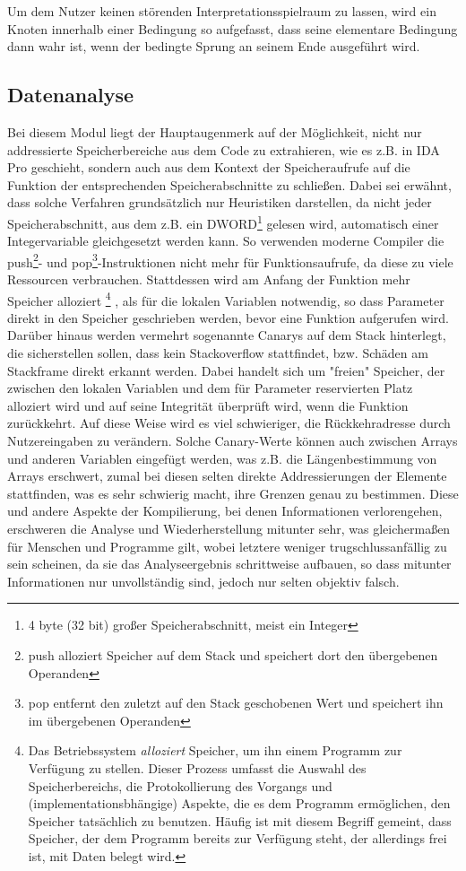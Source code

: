 \documentclass[11pt]{article}
\begin{document}
\begin{enumerate}
\begin{enumerate}
{				Um dem Nutzer keinen störenden Interpretationsspielraum zu
				lassen, wird ein Knoten innerhalb einer Bedingung so aufgefasst, dass seine
				elementare Bedingung dann wahr ist, wenn der bedingte Sprung an seinem Ende
				ausgeführt wird.}
		\end{enumerate}
\end{enumerate}

\subsection{Datenanalyse}
Bei diesem Modul liegt der Hauptaugenmerk auf der Möglichkeit, nicht nur
addressierte Speicherbereiche aus dem Code zu extrahieren, wie es z.B. in IDA Pro
geschieht, sondern auch aus dem Kontext der Speicheraufrufe auf die Funktion der entsprechenden
Speicherabschnitte zu schließen. Dabei sei erwähnt, dass solche Verfahren grundsätzlich nur
Heuristiken darstellen, da nicht jeder Speicherabschnitt, aus dem z.B. ein DWORD\footnote{4 byte (32
bit) großer Speicherabschnitt, meist ein Integer} gelesen wird, automatisch einer Integervariable
gleichgesetzt werden kann. So verwenden moderne Compiler die push\footnote{push alloziert Speicher
auf dem Stack und speichert dort den übergebenen Operanden}- und pop\footnote{pop entfernt den
zuletzt auf den Stack geschobenen Wert und speichert ihn im übergebenen Operanden}-Instruktionen
nicht mehr für Funktionsaufrufe, da diese zu viele Ressourcen verbrauchen. Stattdessen wird am
Anfang der Funktion mehr Speicher alloziert
\footnote{Das Betriebssystem \textit{alloziert} Speicher, um ihn einem Programm zur Verfügung zu
stellen. Dieser Prozess umfasst die Auswahl des Speicherbereichs, die Protokollierung des Vorgangs
und (implementationsbhängige) Aspekte, die es dem Programm ermöglichen, den Speicher tatsächlich
zu benutzen. Häufig ist mit diesem Begriff gemeint, dass Speicher, der dem Programm bereits zur Verfügung
steht, der allerdings frei ist, mit Daten belegt wird.}
, als für die lokalen Variablen notwendig, so dass
Parameter direkt in den Speicher geschrieben werden, bevor eine Funktion aufgerufen wird. Darüber
hinaus werden vermehrt sogenannte Canarys auf dem Stack hinterlegt, die sicherstellen sollen, dass
kein Stackoverflow stattfindet, bzw. Schäden am Stackframe direkt erkannt werden.
Dabei handelt sich um "freien" Speicher, der zwischen den lokalen
Variablen und dem für Parameter reservierten Platz alloziert wird und auf seine Integrität überprüft
wird, wenn die Funktion zurückkehrt. Auf diese Weise wird es viel schwieriger, die Rückkehradresse
durch Nutzereingaben zu verändern. Solche Canary-Werte können auch zwischen Arrays und anderen
Variablen eingefügt werden, was z.B. die Längenbestimmung von Arrays erschwert, zumal bei diesen
selten direkte Addressierungen der Elemente stattfinden, was es sehr schwierig macht, ihre Grenzen
genau zu bestimmen. Diese und andere Aspekte der Kompilierung, bei denen Informationen verlorengehen,
erschweren die Analyse und Wiederherstellung mitunter sehr, was gleichermaßen für Menschen und
Programme gilt, wobei letztere weniger trugschlussanfällig zu sein scheinen, da sie das Analyseergebnis
schrittweise aufbauen, so dass mitunter Informationen nur unvollständig sind, jedoch nur selten objektiv falsch.
\end{document}
